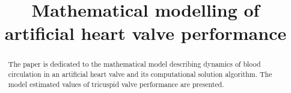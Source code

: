 \documentclass[conference]{IEEEtran}
\begin{document}
%
\title{Mathematical modelling of artificial heart valve performance}


\author{
    \and
}


% 








\maketitle


\begin{abstract}
The paper is dedicated to the mathematical model describing dynamics of blood circulation in an artificial heart valve and its computational solution algorithm. The model estimated values of tricuspid valve performance are presented.
\end{abstract}
\end{document}
